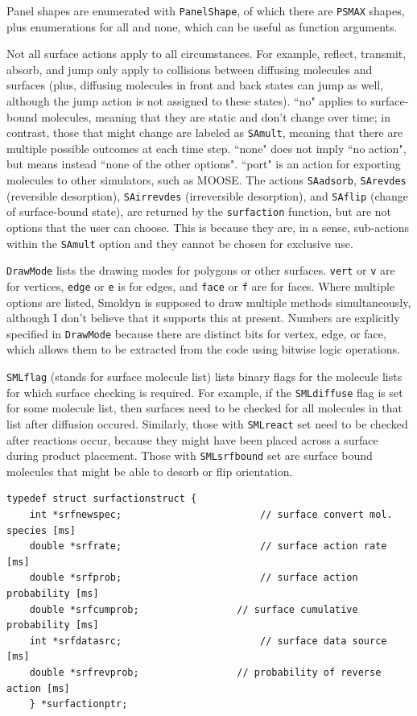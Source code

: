 \documentclass {scrbook}
\newcommand {\ttt} {\texttt}
\begin{document}
Panel shapes are enumerated with \ttt{PanelShape}, of which there are \ttt{PSMAX} shapes, plus enumerations for all and none, which can be useful as function arguments.

Not all surface actions apply to all circumstances. For example, reflect, transmit, absorb, and jump only apply to collisions between diffusing molecules and surfaces (plus, diffusing molecules in front and back states can jump as well, although the jump action is not assigned to these states). ``no" applies to surface-bound molecules, meaning that they are static and don't change over time; in contrast, those that might change are labeled as \ttt{SAmult}, meaning that there are multiple possible outcomes at each time step. ``none" does not imply ``no action", but means instead ``none of the other options". ``port" is an action for exporting molecules to other simulators, such as MOOSE. The actions \ttt{SAadsorb}, \ttt{SArevdes} (reversible desorption), \ttt{SAirrevdes} (irreversible desorption), and \ttt{SAflip} (change of surface-bound state), are returned by the \ttt{surfaction} function, but are not options that the user can choose. This is because they are, in a sense, sub-actions within the \ttt{SAmult} option and they cannot be chosen for exclusive use.

\ttt{DrawMode} lists the drawing modes for polygons or other surfaces. \ttt{vert} or \ttt{v} are for vertices, \ttt{edge} or \ttt{e} is for edges, and \ttt{face} or \ttt{f} are for faces. Where multiple options are listed, Smoldyn is supposed to draw multiple methods simultaneously, although I don't believe that it supports this at present. Numbers are explicitly specified in \ttt{DrawMode} because there are distinct bits for vertex, edge, or face, which allows them to be extracted from the code using bitwise logic operations.

\ttt{SMLflag} (stands for surface molecule list) lists binary flags for the molecule lists for which surface checking is required. For example, if the \ttt{SMLdiffuse} flag is set for some molecule list, then surfaces need to be checked for all molecules in that list after diffusion occured. Similarly, those with \ttt{SMLreact} set need to be checked after reactions occur, because they might have been placed across a surface during product placement. Those with \ttt{SMLsrfbound} set are surface bound molecules that might be able to desorb or flip orientation.

\begin{lstlisting}
typedef struct surfactionstruct {
	int *srfnewspec;						// surface convert mol. species [ms]
	double *srfrate;						// surface action rate [ms]
	double *srfprob;						// surface action probability [ms]
	double *srfcumprob;					// surface cumulative probability [ms]
	int *srfdatasrc;						// surface data source [ms]
	double *srfrevprob;					// probability of reverse action [ms]
	} *surfactionptr;
\end{lstlisting}
\end{document}
